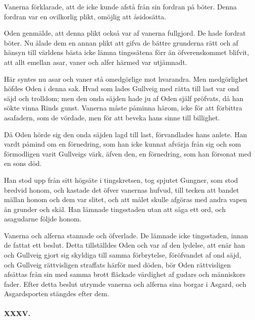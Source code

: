 Vanerna förklarade, att de icke kunde afstå från sin fordran på böter.
Denna fordran var en ovilkorlig plikt, omöjlig att åsidosätta.

Oden genmälde, att denna plikt också var af vanerna fullgjord. De hade
fordrat böter. Nu ålade dem en annan plikt att gifva de bättre grunderna
rätt och af hänsyn till världens bästa icke lämna tingssätena förr än
öfverenskommet blifvit, att allt emellan asar, vaner och alfer härmed
var utjämnadt.

Här syntes nu asar och vaner stå omedgörlige mot hvarandra. Men
medgörlighet höfdes Oden i denna sak. Hvad som lades Gullveig med rätta
till last var ond säjd och
trolldom\protect\hypertarget{lb1625905.xhtmlux5cux23start143}{}{}\protect\hypertarget{lb1625905.xhtmlux5cux23start143-a}{}{}\protect\hypertarget{lb1625905.xhtmlux5cux23start143-b}{}{}\protect\hypertarget{lb1625905.xhtmlux5cux23start143-c}{}{}\protect\hypertarget{lb1625905.xhtmlux5cux23start143-d}{}{};
men den onda säjden hade ju af Oden själf pröfvats, då han sökte vinna
Rinds gunst. Vanerna måste påminna härom, icke för att förbittra
asafadern, som de vördade, men för att beveka hans sinne till billighet.

Då Oden hörde sig den onda säjden lagd till last, förvandlades hans
anlete. Han vardt påmind om en förnedring, som han icke kunnat afvärja
från sig och som förmodligen varit Gullveigs värk, äfven den, en
förnedring, som han försonat med en sons död.

Han stod upp från sitt högsäte i tingskretsen, tog spjutet Gungner, som
stod bredvid honom, och kastade det öfver vanernas hufvud, till tecken
att bandet mällan honom och dem var slitet, och att målet skulle afgöras
med andra vapen än grunder och skäl. Han lämnade tingsstaden utan att
säga ett ord, och asagudarne följde honom.

Vanerna och alferna stannade och öfverlade. De lämnade icke tingsstaden,
innan de fattat ett beslut. Detta tillställdes Oden och var af den
lydelse, att enär han och Gullveig gjort sig skyldiga till samma
förbrytelse, föröfvandet af ond säjd, och Gullveig rättvisligen
straffats härför med döden, bör Oden rättvisligen afsättas från sin med
samma brott fläckade värdighet af gudars och människors fader. Efter
detta beslut utrymde vanerna och alferna sina borgar i Asgard, och
Asgardsporten stängdes efter dem.

\paragraph{XXXV.}

